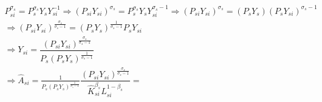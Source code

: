 \begin{gather*}
    P_{si}^{\sigma_s} = P_s^{\sigma_s} Y_s Y_{si}^{-1} 
    \Rightarrow (P_{si}Y_{si})^{\sigma_s} = P_s^{\sigma_s} Y_s Y_{si}^{\sigma_s-1}
    \Rightarrow (P_{si}Y_{si})^{\sigma_s} = (P_sY_s)(P_sY_{si})^{\sigma_s-1}\\
    \Rightarrow (P_{si}Y_{si})^{\frac{\sigma_s}{\sigma_s-1}} = (P_sY_s)^{\frac{1}{\sigma_s-1}}P_sY_{si}\\
    \Rightarrow Y_{si} = \dfrac{(P_{si}Y_{si})^{\frac{\sigma_s}{\sigma_s-1}}}{P_s(P_sY_s)^{\frac{1}{\sigma_s-1}}}\\
    \Rightarrow \hat{A}_{si} = \frac{1}{P_s(P_sY_s)^{\frac{1}{\sigma_s-1}}}\dfrac{(P_{si}Y_{si})^{\frac{\sigma_s}{\sigma_s-1}}}{\hat{K}_{si}^{\beta_s} L_{si}^{1-\beta_s}} = 
\end{gather*}